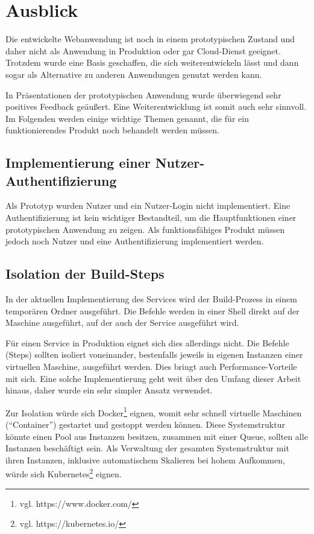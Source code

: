\chapter{Ausblick}

Die entwickelte Webanwendung ist noch in einem prototypischen Zustand und daher nicht als Anwendung in Produktion oder gar Cloud-Dienst geeignet. Trotzdem wurde eine Basis geschaffen, die sich weiterentwickeln lässt und dann sogar als Alternative zu anderen Anwendungen genutzt werden kann.

In Präsentationen der prototypischen Anwendung wurde überwiegend sehr positives Feedback geäußert. Eine Weiterentwicklung ist somit auch sehr sinnvoll. Im Folgenden werden einige wichtige Themen genannt, die für ein funktionierendes Produkt noch behandelt werden müssen.

\section{Implementierung einer Nutzer-Authentifizierung}

Als Prototyp wurden Nutzer und ein Nutzer-Login nicht implementiert. Eine Authentifizierung ist kein wichtiger Bestandteil, um die Hauptfunktionen einer prototypischen Anwendung zu zeigen. Als funktionsfähiges Produkt müssen jedoch noch Nutzer und eine Authentifizierung implementiert werden.

\section{Isolation der Build-Steps}

In der aktuellen Implementierung des Services wird der Build-Prozess in einem temporären Ordner ausgeführt. Die Befehle werden in einer Shell direkt auf der Maschine ausgeführt, auf der auch der Service ausgeführt wird.

Für einen Service in Produktion eignet sich dies allerdings nicht. Die Befehle (Steps) sollten isoliert voneinander, bestenfalls jeweils in eigenen Instanzen einer virtuellen Maschine, ausgeführt werden. Dies bringt auch Performance-Vorteile mit sich. Eine solche Implementierung geht weit über den Umfang dieser Arbeit hinaus, daher wurde ein sehr simpler Ansatz verwendet.

Zur Isolation würde sich Docker\footnote{vgl. https://www.docker.com/} eignen, womit sehr schnell virtuelle Maschinen (``Container'') gestartet und gestoppt werden können. Diese Systemstruktur könnte einen Pool aus Instanzen besitzen, zusammen mit einer Queue, sollten alle Instanzen beschäftigt sein. Als Verwaltung der gesamten Systemstruktur mit ihren Instanzen, inklusive automatischem Skalieren bei hohem Aufkommen, würde sich Kubernetes\footnote{vgl. https://kubernetes.io/} eignen.

